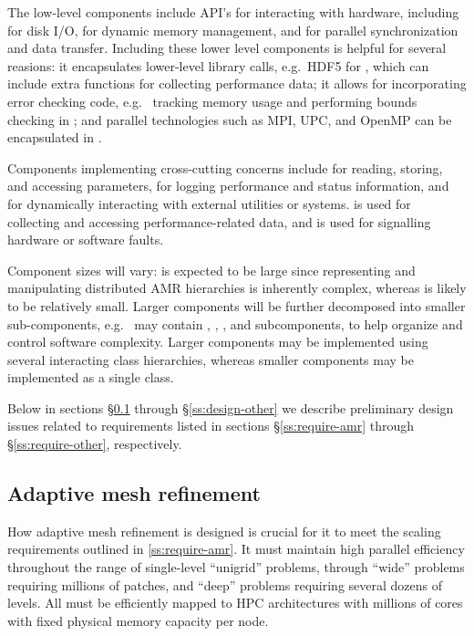 \documentclass[10pt,twocolumn]{article}
\begin{document}
The low-level components include API's for interacting with hardware,
including  for disk I/O,  for dynamic memory
management, and  for parallel synchronization and data
transfer.  Including these lower level components is helpful for
several reasions: it encapsulates lower-level library calls, e.g.~HDF5
for , which can include extra functions for collecting
performance data; it allows for incorporating error checking code,
e.g.~ tracking memory usage and performing bounds checking in
; and parallel technologies such as MPI, UPC, and OpenMP
can be encapsulated in .

Components implementing cross-cutting concerns include
 for reading, storing, and accessing parameters,
 for logging performance and status information, and
 for dynamically interacting with external utilities or
systems.   is used for collecting and accessing
performance-related data, and  is used for signalling
hardware or software faults.

Component sizes will vary:  is expected to be large since
representing and manipulating distributed AMR hierarchies is
inherently complex, whereas  is likely to be relatively
small.  Larger components will be further decomposed into smaller
sub-components, e.g.~ may contain , ,
, and  subcomponents, to help organize and
control software complexity.  Larger components may be implemented
using several interacting class hierarchies, whereas smaller
components may be implemented as a single class.

Below in sections \S\ref{ss:design-amr} through
\S\ref{ss:design-other} we describe preliminary design issues
related to requirements listed in sections \S\ref{ss:require-amr}
through \S\ref{ss:require-other}, respectively.

\subsection{Adaptive mesh refinement} \label{ss:design-amr}

How adaptive mesh refinement is designed is crucial for it to meet the
scaling requirements outlined in \ref{ss:require-amr}.  It must
maintain high parallel efficiency throughout the range of single-level
``unigrid'' problems, through ``wide'' problems requiring millions of
patches, and ``deep'' problems requiring several dozens of levels.
All must be efficiently mapped to HPC architectures with millions of
cores with fixed physical memory capacity per node.
\end{document}
